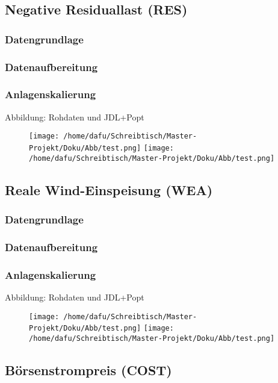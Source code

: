\documentclass[onecolumn,10pt,titlepage]{article}
\begin{document}
\subsection{Negative Residuallast (RES)}
\subsubsection{Datengrundlage}
\subsubsection{Datenaufbereitung}
\subsubsection{Anlagenskalierung}
Abbildung: Rohdaten und JDL+Popt
\begin{figure}[H]
	
	\centering
	\texttt{[image: /home/dafu/Schreibtisch/Master-Projekt/Doku/Abb/test.png]}
	\texttt{[image: /home/dafu/Schreibtisch/Master-Projekt/Doku/Abb/test.png]}
	\caption{ }
	\label{fig:JDL_RES} 
\end{figure}


\subsection{Reale Wind-Einspeisung (WEA)}
\subsubsection{Datengrundlage}
\subsubsection{Datenaufbereitung}
\subsubsection{Anlagenskalierung}
Abbildung: Rohdaten und JDL+Popt
\begin{figure}[H]
	
	\centering
	\texttt{[image: /home/dafu/Schreibtisch/Master-Projekt/Doku/Abb/test.png]}
	\texttt{[image: /home/dafu/Schreibtisch/Master-Projekt/Doku/Abb/test.png]}
	\caption{ }
	\label{fig:JDL_WEA} 
\end{figure}

\subsection{Börsenstrompreis (COST)}
\end{document}
